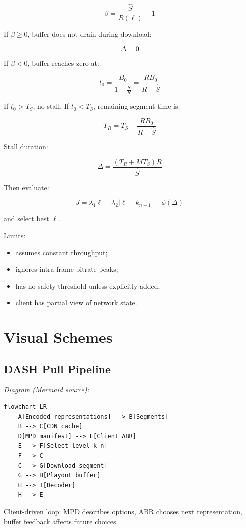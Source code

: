 \[
\beta=\frac{\hat{S}}{R(\ell)}-1
\]

If $\beta\geq 0$, buffer does not drain during download:

\[
\Delta=0
\]

If $\beta<0$, buffer reaches zero at:

\[
t_0=\frac{B_0}{1-\frac{\hat{S}}{R}}
=\frac{R B_0}{R-\hat{S}}
\]

If $t_0>T_S$, no stall. If $t_0<T_S$, remaining segment time is:

\[
T_R=T_S-\frac{R B_0}{R-\hat{S}}
\]

Stall duration:

\[
\Delta=\frac{(T_R+M T_S)R}{\hat{S}}
\]

Then evaluate:

\[
J=\lambda_1 \ell-\lambda_2|\ell-k_{n-1}|-\phi(\Delta)
\]

and select best $\ell$.

Limits:

\begin{itemize}
  \item assumes constant throughput;
  \item ignores intra-frame bitrate peaks;
  \item has no safety threshold unless explicitly added;
  \item client has partial view of network state.
\end{itemize}

\section{Visual Schemes}

\subsection{DASH Pull Pipeline}

\begin{center}\footnotesize\itshape Diagram (Mermaid source):\end{center}
\begin{verbatim}
flowchart LR
    A[Encoded representations] --> B[Segments]
    B --> C[CDN cache]
    D[MPD manifest] --> E[Client ABR]
    E --> F[Select level k_n]
    F --> C
    C --> G[Download segment]
    G --> H[Playout buffer]
    H --> I[Decoder]
    H --> E
\end{verbatim}

Client-driven loop: MPD describes options, ABR chooses next representation, buffer feedback affects future choices.

